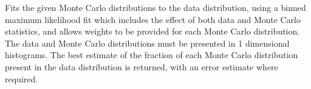  
\newpage%

 
\Action
Fits the given Monte Carlo distributions to the data distribution, using
a binned maximum likelihood fit which includes the effect of both data and 
Monte Carlo statistics, and allows weights to be 
provided for each Monte Carlo distribution.  The data and Monte Carlo
distributions must be presented in 1 dimensional histograms.  
The best estimate of the fraction of each Monte 
Carlo distribution present in the data distribution is returned, with an
error estimate where required.
 
